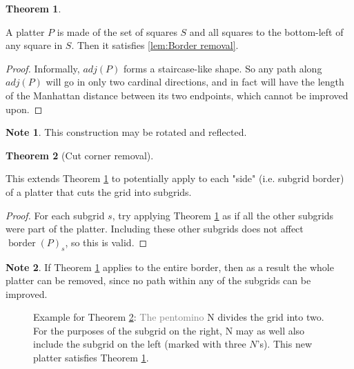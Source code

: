 \documentclass{article}
\theoremstyle{definition}%
\newtheorem{theorem}{Theorem}[section]
\newtheorem*{note}{Note}
\newcommand{\minordetail}[1]{\textcolor{gray}{#1}}
\newcommand{\border}{\operatorname{border}}
\begin{document}
\begin{theorem}
\label{th:Corner removal}

A platter $P$ is made of the set of squares $S$ and all squares to the bottom-left of any square in $S$. Then it satisfies \ref{lem:Border removal}.
\end{theorem}

\begin{proof}
Informally, $adj(P)$ forms a staircase-like shape. So any path along $adj(P)$ will go in only two cardinal directions, and in fact will have the length of the Manhattan distance between its two endpoints, which cannot be improved upon.
\end{proof}

\begin{note}
This construction may be rotated and reflected.
\end{note}

\begin{theorem}[Cut corner removal]
\label{th:Cut corner removal}

This extends Theorem \ref{th:Corner removal} to potentially apply to each "side" (i.e. subgrid border) of a platter that cuts the grid into subgrids.
\end{theorem}

\begin{proof}
For each subgrid $s$, try applying Theorem \ref{th:Corner removal} as if all the other subgrids were part of the platter. Including these other subgrids does not affect $\border(P)_s$, so this is valid.
\end{proof}

\begin{note}
If Theorem \ref{th:Corner removal} applies to the entire border, then as a result the whole platter can be removed, since no path within any of the subgrids can be improved.
\end{note}

\begin{figure}
    \centering
    \caption{Example for Theorem \ref{th:Cut corner removal}: \minordetail{The pentomino} N divides the grid into two. For the purposes of the subgrid on the right, N may as well also include the subgrid on the left (marked with three $N$'s). This new platter satisfies Theorem \ref{th:Corner removal}.}
\end{figure}
\end{document}
